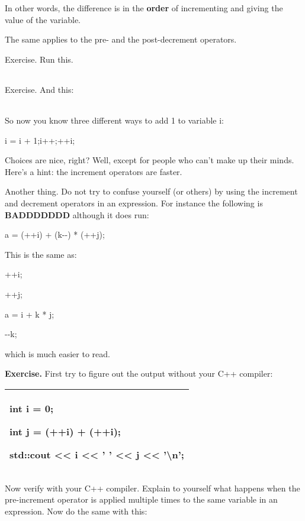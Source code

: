 \documentclass[
]{article}
\begin{document}
In other words, the difference is in the \textbf{order} of incrementing
and giving the value of the variable.

The same applies to the pre- and the post-decrement operators.

Exercise. Run this.

\begin{longtable}[]{@{}@{}}
\toprule
\endhead
\bottomrule
\end{longtable}

Exercise. And this:

\begin{longtable}[]{@{}@{}}
\toprule
\endhead
\bottomrule
\end{longtable}

So now you know three different ways to add 1 to variable i:

i = i + 1;i++;++i;

Choices are nice, right? Well, except for people who can't make up their
minds. Here's a hint: the increment operators are faster.

Another thing. Do not try to confuse yourself (or others) by using the
increment and decrement operators in an expression. For instance the
following is \textbf{BADDDDDDD} although it does run:

a = (++i) + (k-\/-) * (++j);

This is the same as:

++i;

++j;

a = i + k * j;

-\/-k;

which is much easier to read.

\textbf{Exercise. }First try to figure out the output without your C++
compiler:

\begin{longtable}[]{@{}l@{}}
\toprule
\endhead
\begin{minipage}[t]{0.97\columnwidth}\raggedright
int i = 0;

int j = (++i) + (++i);

std::cout \textless\textless{} i \textless\textless{} ' '
\textless\textless{} j \textless\textless{} '\textbackslash n';\strut
\end{minipage}\tabularnewline
\bottomrule
\end{longtable}

Now verify with your C++ compiler. Explain to yourself what happens when
the pre-increment operator is applied multiple times to the same
variable in an expression. Now do the same with this:
\end{document}
